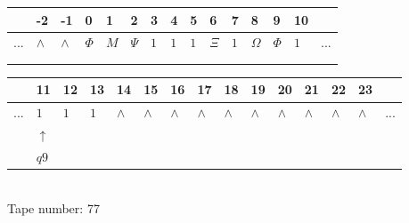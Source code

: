 \documentclass[11pt]{article}
\begin{document}
\begin{table}[H]
\centering
\begin{tabular}{lllllllllllllll}
 & -2 & -1 & 0 & 1 & 2 & 3 & 4 & 5 & 6 & 7 & 8 & 9 & 10 & \\
\hline
$...$ & \multicolumn{1}{|l|}{$\wedge$} & \multicolumn{1}{|l|}{$\wedge$} & \multicolumn{1}{|l|}{$\Phi$} & \multicolumn{1}{|l|}{$M$} & \multicolumn{1}{|l|}{$\Psi$} & \multicolumn{1}{|l|}{$1$} & \multicolumn{1}{|l|}{$1$} & \multicolumn{1}{|l|}{$1$} & \multicolumn{1}{|l|}{$\Xi$} & \multicolumn{1}{|l|}{$1$} & \multicolumn{1}{|l|}{$\Omega$} & \multicolumn{1}{|l|}{$\Phi$} & \multicolumn{1}{|l|}{$1$} & $...$\\
\hline
&  &  &  &  &  &  &  &  &  &  &  &  &  &  \\
&  &  &  &  &  &  &  &  &  &  &  &  &  &  \\
\end{tabular}
\begin{tabular}{lllllllllllllll}
 & 11 & 12 & 13 & 14 & 15 & 16 & 17 & 18 & 19 & 20 & 21 & 22 & 23 & \\
\hline
$...$ & \multicolumn{1}{|l|}{$1$} & \multicolumn{1}{|l|}{$1$} & \multicolumn{1}{|l|}{$1$} & \multicolumn{1}{|l|}{$\wedge$} & \multicolumn{1}{|l|}{$\wedge$} & \multicolumn{1}{|l|}{$\wedge$} & \multicolumn{1}{|l|}{$\wedge$} & \multicolumn{1}{|l|}{$\wedge$} & \multicolumn{1}{|l|}{$\wedge$} & \multicolumn{1}{|l|}{$\wedge$} & \multicolumn{1}{|l|}{$\wedge$} & \multicolumn{1}{|l|}{$\wedge$} & \multicolumn{1}{|l|}{$\wedge$} & $...$\\
\hline
& $\uparrow$ &  &  &  &  &  &  &  &  &  &  &  &  &  \\
& $ q9 $ &  &  &  &  &  &  &  &  &  &  &  &  &  \\
\end{tabular}
\\
Tape number: 77
\noindent\makebox[\linewidth]{\hdashrule{\textwidth}{1pt}{1pt}}\end{table}
\end{document}
